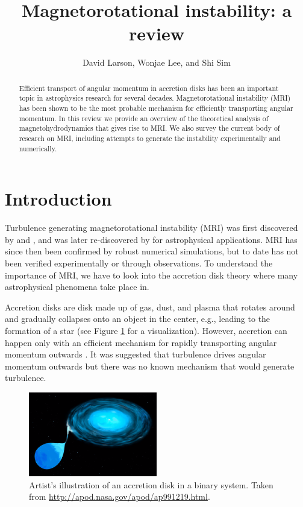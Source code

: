 \documentclass{jfm}
\title[Magnetorotational instability]{Magnetorotational instability: a review}
\author[Larson, Lee, and Sim]{David Larson, Wonjae Lee, and Shi Sim}
\affiliation{University of California, San Diego}
\begin{document}
\maketitle


\begin{abstract}
Efficient transport of angular momentum in accretion disks has been an
important topic in astrophysics research for several decades. Magnetorotational
instability (MRI) has been shown to be the most probable mechanism for
efficiently transporting angular momentum. In this review we provide an
overview of the theoretical analysis of magnetohydrodynamics that gives rise to
MRI. We also survey the current body of research on MRI, including attempts to
generate the instability experimentally and numerically.
\end{abstract}



\section{Introduction}
\label{sec:intro}

Turbulence generating magnetorotational instability (MRI) was first discovered
by \cite{Velikhov1959} and \cite{Chandrasekhar1960}, and was later
re-discovered by \cite{Balbus1998} for astrophysical applications. MRI has
since then been confirmed by robust numerical simulations, but to date has not
been verified experimentally or through observations. To understand the
importance of MRI, we have to look into the accretion disk theory where many
astrophysical phenomena take place in.

Accretion disks are disk made up of gas, dust, and plasma that rotates around
and gradually collapses onto an object in the center, e.g., leading to the
formation of a star (see Figure \ref{fig:accretion_disk} for a visualization).
However, accretion can happen only with an efficient mechanism for rapidly
transporting angular momentum outwards \citep{Julien2010}. It was suggested
that turbulence drives angular momentum outwards but there was no known
mechanism that would generate turbulence. 


\begin{figure}
    \centering
    \includegraphics[width=0.5\textwidth]{accretion_disk}
        \caption{Artist's illustration of an accretion disk in a binary system. Taken from \url{http://apod.nasa.gov/apod/ap991219.html}.}
        \label{fig:accretion_disk}
\end{figure}
\end{document}
